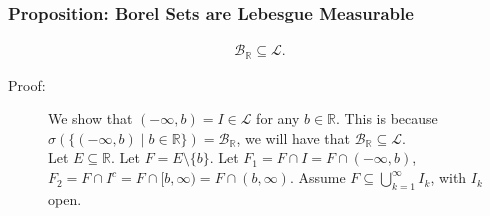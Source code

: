 \documentclass[9pt]{extarticle}
\newcommand{\R}{\mathbb{R}}
\begin{document}
  \subsubsection{Proposition: Borel Sets are Lebesgue Measurable}%
  \begin{align*}
    \mathcal{B}_{\R} \subseteq \mathcal{L}.  
  \end{align*}
  \begin{description}
    \item[Proof:] We show that $(-\infty,b) = I\in \mathcal{L}$ for any $b\in \R$. This is because $\sigma\left(\{(-\infty,b)\mid b\in\R\}\right) = \mathcal{B}_{\R}$, we will have that $\mathcal{B}_{\R}\subseteq \mathcal{L}$.\\

      Let $E\subseteq \R$. Let $F = E\setminus \{b\}$. Let $F_1 = F\cap I = F \cap (-\infty,b)$, $F_2 = F\cap I^{c} = F\cap [b,\infty) = F\cap (b,\infty)$. Assume $F \subseteq \bigcup_{k=1}^{\infty} I_k$, with $I_k$ open.\\


\end{description}
\end{document}
